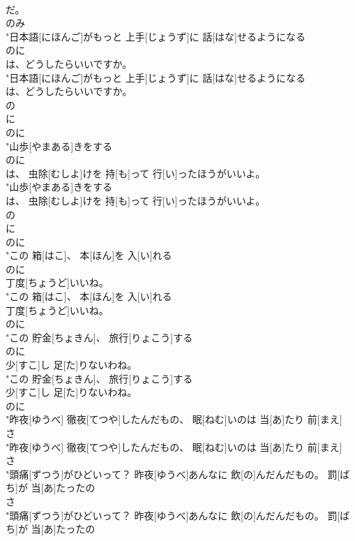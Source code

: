 \documentclass[8pt]{extreport}
\begin{document}
\begin{CJK}{UTF8}{min}
\\	だ。
\\	のみ
\\	"日本語[にほんご]がもっと 上手[じょうず]に 話[はな]せるようになる
\\	のに
\\	は、どうしたらいいですか。
\\	"日本語[にほんご]がもっと 上手[じょうず]に 話[はな]せるようになる
\\	は、どうしたらいいですか。
\\	の 
\\	に	
\\	のに
\\	"山歩[やまある]きをする
\\	のに
\\	は、 虫除[むしよ]けを 持[も]って 行[い]ったほうがいいよ。
\\	"山歩[やまある]きをする
\\	は、 虫除[むしよ]けを 持[も]って 行[い]ったほうがいいよ。
\\	の 
\\	に	
\\	のに
\\	"この 箱[はこ]、 本[ほん]を 入[い]れる
\\	のに
\\	丁度[ちょうど]いいね。
\\	"この 箱[はこ]、 本[ほん]を 入[い]れる
\\	丁度[ちょうど]いいね。
\\	のに
\\	"この 貯金[ちょきん]、 旅行[りょこう]する
\\	のに
\\	少[すこ]し 足[た]りないわね。
\\	"この 貯金[ちょきん]、 旅行[りょこう]する
\\	少[すこ]し 足[た]りないわね。
\\	のに
\\	"昨夜[ゆうべ] 徹夜[てつや]したんだもの、 眠[ねむ]いのは 当[あ]たり 前[まえ]
\\	さ
\\	"昨夜[ゆうべ] 徹夜[てつや]したんだもの、 眠[ねむ]いのは 当[あ]たり 前[まえ]
\\	さ
\\	"頭痛[ずつう]がひどいって？ 昨夜[ゆうべ]あんなに 飲[の]んだんだもの。 罰[ばち]が 当[あ]たったの
\\	さ
\\	"頭痛[ずつう]がひどいって？ 昨夜[ゆうべ]あんなに 飲[の]んだんだもの。 罰[ばち]が 当[あ]たったの

\end{CJK}
\end{document}
